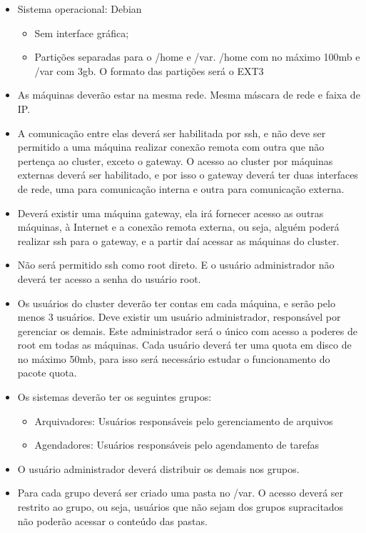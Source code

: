 \documentclass[
	12pt,				%
	openany,			%
	a4paper,			%
	chapter=TITLE,		%
	section=TITLE,		%
	english,
	brazil				%
]{abntex2}
\begin{document}
\begin{itemize}
	\item Sistema operacional: Debian
	\begin{itemize}
		\item Sem interface gráfica;
		\item Partições separadas para o /home e /var. /home com no máximo 100mb e /var com 3gb. O formato das partições será o EXT3
	\end{itemize}

	\item As máquinas deverão estar na mesma rede. Mesma máscara de rede e faixa de IP.

	\item A comunicação entre elas deverá ser habilitada por ssh, e não deve ser permitido a uma máquina realizar conexão remota com outra que não pertença ao cluster, exceto o gateway. O acesso ao cluster por máquinas externas deverá ser habilitado, e por isso o gateway deverá ter duas interfaces de rede, uma para comunicação interna e outra para comunicação externa.

	\item Deverá existir uma máquina gateway, ela irá fornecer acesso as outras máquinas, à Internet e a conexão remota externa, ou seja, alguém poderá realizar ssh para o gateway, e a partir daí acessar as máquinas do cluster.

	\item Não será permitido ssh como root direto. E o usuário administrador não deverá ter acesso a senha do usuário root.

	\item Os usuários do cluster deverão ter contas em cada máquina, e serão pelo menos 3 usuários. Deve existir um usuário administrador, responsável por gerenciar os demais. Este administrador será o único com acesso a poderes de root em todas as máquinas. Cada usuário deverá ter uma quota em disco de no máximo 50mb, para isso será necessário estudar o funcionamento do pacote quota.

	\item Os sistemas deverão ter os seguintes grupos:
		\begin{itemize}
			\item Arquivadores: Usuários responsáveis pelo gerenciamento de arquivos
			\item Agendadores: Usuários responsáveis pelo agendamento de tarefas
		\end{itemize}		    	
    	
	\item O usuário administrador deverá distribuir os demais nos grupos.

	\item Para cada grupo deverá ser criado uma pasta no /var. O acesso deverá ser restrito ao grupo, ou seja, usuários que não sejam dos grupos supracitados não poderão acessar o conteúdo das pastas.

\end{itemize}
\end{document}
